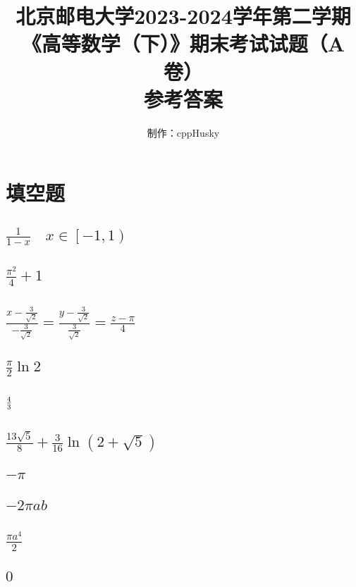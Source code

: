 \documentclass[12pt]{ctexart}
\title{北京邮电大学2023-2024学年第二学期\\《高等数学（下）》期末考试试题（A卷）\\参考答案}
\author{制作：cppHusky}
\date{}
\begin{document}
\pagestyle{fancy}
\fancyhf{}
\maketitle
\thispagestyle{fancy}
\section{填空题}
\subsection{$\frac{1}{1-x}\quad x\in\left[-1,1\right)$}
\subsection{$\frac{\pi^{2}}{4}+1$}
\subsection{$\frac{x-\frac{3}{\sqrt{2}}}{-\frac{3}{\sqrt{2}}}=\frac{y-\frac{3}{\sqrt{2}}}{\frac{3}{\sqrt{2}}}=\frac{z-\pi}{4}$}
\subsection{$\frac{\pi}{2}\ln{2}$}
\subsection{$4\over3$}
\subsection{$\frac{13\sqrt{5}}{8}+\frac{3}{16}\ln(2+\sqrt{5})$}
\subsection{$-\pi$}
\subsection{$-2\pi ab$}
\subsection{$\frac{\pi a^4}{2}$}
\subsection{$0$}
\pagebreak
\end{document}
